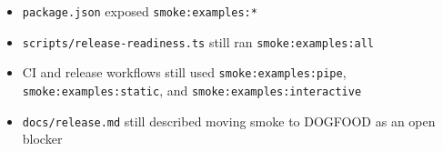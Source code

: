 \begin{itemize}
\tightlist
\item
  \texttt{p\allowbreak{}a\allowbreak{}c\allowbreak{}k\allowbreak{}a\allowbreak{}g\allowbreak{}e\allowbreak{}.\allowbreak{}j\allowbreak{}s\allowbreak{}o\allowbreak{}n} exposed \texttt{s\allowbreak{}m\allowbreak{}o\allowbreak{}k\allowbreak{}e\allowbreak{}:\allowbreak{}e\allowbreak{}x\allowbreak{}a\allowbreak{}m\allowbreak{}p\allowbreak{}l\allowbreak{}e\allowbreak{}s\allowbreak{}:\allowbreak{}*}
\item
  \texttt{s\allowbreak{}c\allowbreak{}r\allowbreak{}i\allowbreak{}p\allowbreak{}t\allowbreak{}s\allowbreak{}/\allowbreak{}r\allowbreak{}e\allowbreak{}l\allowbreak{}e\allowbreak{}a\allowbreak{}s\allowbreak{}e\allowbreak{}-\allowbreak{}r\allowbreak{}e\allowbreak{}a\allowbreak{}d\allowbreak{}i\allowbreak{}n\allowbreak{}e\allowbreak{}s\allowbreak{}s\allowbreak{}.\allowbreak{}t\allowbreak{}s} still ran \texttt{s\allowbreak{}m\allowbreak{}o\allowbreak{}k\allowbreak{}e\allowbreak{}:\allowbreak{}e\allowbreak{}x\allowbreak{}a\allowbreak{}m\allowbreak{}p\allowbreak{}l\allowbreak{}e\allowbreak{}s\allowbreak{}:\allowbreak{}a\allowbreak{}l\allowbreak{}l}
\item
  CI and release workflows still used \texttt{s\allowbreak{}m\allowbreak{}o\allowbreak{}k\allowbreak{}e\allowbreak{}:\allowbreak{}e\allowbreak{}x\allowbreak{}a\allowbreak{}m\allowbreak{}p\allowbreak{}l\allowbreak{}e\allowbreak{}s\allowbreak{}:\allowbreak{}p\allowbreak{}i\allowbreak{}p\allowbreak{}e}, \texttt{s\allowbreak{}m\allowbreak{}o\allowbreak{}k\allowbreak{}e\allowbreak{}:\allowbreak{}e\allowbreak{}x\allowbreak{}a\allowbreak{}m\allowbreak{}p\allowbreak{}l\allowbreak{}e\allowbreak{}s\allowbreak{}:\allowbreak{}s\allowbreak{}t\allowbreak{}a\allowbreak{}t\allowbreak{}i\allowbreak{}c}, and \texttt{s\allowbreak{}m\allowbreak{}o\allowbreak{}k\allowbreak{}e\allowbreak{}:\allowbreak{}e\allowbreak{}x\allowbreak{}a\allowbreak{}m\allowbreak{}p\allowbreak{}l\allowbreak{}e\allowbreak{}s\allowbreak{}:\allowbreak{}i\allowbreak{}n\allowbreak{}t\allowbreak{}e\allowbreak{}r\allowbreak{}a\allowbreak{}c\allowbreak{}t\allowbreak{}i\allowbreak{}v\allowbreak{}e}
\item
  \texttt{d\allowbreak{}o\allowbreak{}c\allowbreak{}s\allowbreak{}/\allowbreak{}r\allowbreak{}e\allowbreak{}l\allowbreak{}e\allowbreak{}a\allowbreak{}s\allowbreak{}e\allowbreak{}.\allowbreak{}m\allowbreak{}d} still described moving smoke to DOGFOOD as an open blocker
\end{itemize}


